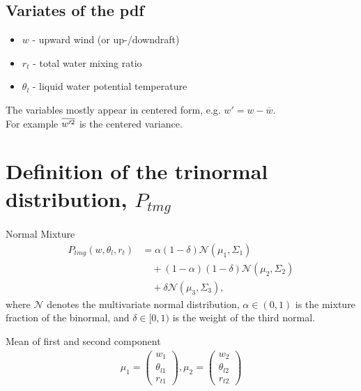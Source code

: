 \documentclass[10pt]{beamer}
\numberwithin{equation}{section}
\begin{document}
    \subsection{Variates of the pdf}\label{subsec:variates-of-the-pdf}

    \begin{frame}
        \begin{itemize}
            \item $w$ - upward wind (or up-/downdraft)
            \item $r_t$ - total water mixing ratio
            \item $\theta_l$ - liquid water potential temperature
        \end{itemize}
        \vspace{2cm}

        The variables mostly appear in centered form,
        e.g. $w' = w - \overline{w}$. \\
        For example $\overline{w'^2}$ is the centered variance.
    \end{frame}


    \section{Definition of the trinormal distribution, \texorpdfstring{$P_{tmg}$}{P tmg}}
    \label{sec:definition-of-the-trinormal-distribution-p_tmg}

    \begin{frame}{Normal Mixture}
        \begin{align}
            \label{eq:normal_mix_pdf}
            P_{tmg}(w, \theta_l, r_t)
            &= \alpha (1-\delta) \mathcal{N}(\mu_1, \Sigma_1) \nonumber\\
            &\quad+ (1-\alpha) (1-\delta) \mathcal{N}(\mu_2, \Sigma_2) \nonumber\\
            &\quad+ \delta \mathcal{N}(\mu_3, \Sigma_3),
        \end{align}
        where $\mathcal{N}$ denotes the multivariate normal distribution,
        $\alpha \in (0,1)$ is the mixture fraction of the binormal,
        and $\delta \in [0,1)$ is the weight of the third normal.
    \end{frame}

    \begin{frame}{Mean of first and second component}
        \begin{align}
            \mu_1 =
            \begin{pmatrix}
                w_1         \\
                \theta_{l1} \\
                r_{t1}
            \end{pmatrix},
            \mu_2 =
            \begin{pmatrix}
                w_2         \\
                \theta_{l2} \\
                r_{t2}
            \end{pmatrix}
        \end{align}
    \end{frame}
\end{document}
